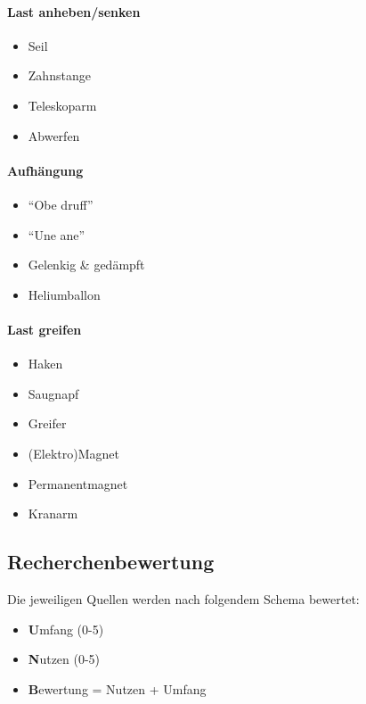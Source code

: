 \documentclass[a4paper]{report}
\begin{document}
\begin{multicols}{2}
\paragraph{Last anheben/senken}
\begin{itemize}[noitemsep]
	\item Seil
	\item Zahnstange
	\item Teleskoparm
	\item Abwerfen
\end{itemize}
\vspace{2em}
\paragraph{Aufhängung}
\begin{itemize}[noitemsep]
	\item \textquotedblleft Obe druff\textquotedblright
	\item \textquotedblleft Une ane\textquotedblright
	\item Gelenkig \& gedämpft
	\item Heliumballon
\end{itemize}

\paragraph{Last greifen}
\begin{itemize}[noitemsep]
	\item Haken
	\item Saugnapf
	\item Greifer
	\item (Elektro)Magnet
	\item Permanentmagnet
	\item Kranarm
\end{itemize}
\end{multicols}

\subsection{Recherchenbewertung}
\label{app:ssec:RechBew}
Die jeweiligen Quellen werden nach folgendem Schema bewertet:
\begin{itemize}
	\item \textbf{U}mfang (0-5)
	\item \textbf{N}utzen (0-5)
	\item \textbf{B}ewertung = Nutzen + Umfang
\end{itemize}
\end{document}
